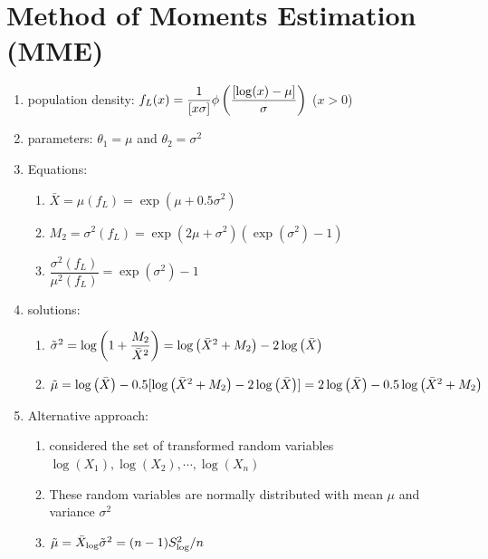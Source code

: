 \section{Method of Moments Estimation (MME) \cite{ism-1}} \label{Lognormal Distribution: MME}
\begin{enumerate}[itemsep=0.2cm]
    \item population density: $
        f_L(x) 
        = \dfrac{1}{[x\sigma]} \phi\left(
            \dfrac{[\log(x) - \mu]}{\sigma}
        \right)
    $ \hfill ($x > 0$)

    \item parameters: 
        $\theta_1 = \mu$ 
        and 
        $\theta_2 = \sigma^2$
    
    \item Equations:
    \begin{enumerate}[itemsep=0.2cm]
        \item $
            \bar{X}
            = \mu(f_L)
            = \exp(\mu + 0.5\sigma^2)
        $

        \item $
            M_2
            = \sigma^2(f_L)
            = \exp(2\mu + \sigma^2)(\exp(\sigma^2) - 1)
        $

        \item $
            \dfrac{\sigma^2(f_L)}{\mu^2(f_L)}
            = \exp(\sigma^2) - 1
        $

    \end{enumerate}

    \item solutions:
    \begin{enumerate}[itemsep=0.2cm]
        \item $
            \tilde{\sigma}^2
            = \log\left(1 + \dfrac{M_2}{\bar{X}^2}\right)
            = \log\left(\bar{X}^2 + {M_2}\right) - 2\log\left(\bar{X}\right)
        $

        \item $
            \tilde{\mu}
            = \log\left(\bar{X}\right) - 0.5[\log\left(\bar{X}^2 + {M_2}\right) - 2\log\left(\bar{X}\right)]
            = 2\log\left(\bar{X}\right) - 0.5\log\left(\bar{X}^2 + {M_2}\right)
        $

    \end{enumerate}

    \item Alternative approach:
    \begin{enumerate}[itemsep=0.2cm]
        \item considered the set of transformed random variables $\log(X_1), \log(X_2),\cdots, \log(X_n)$

        \item These random variables are normally distributed with mean $\mu$ and variance $\sigma^2$

        \item $
            \hfill 
            \tilde{\mu} = \bar{X}_{\log}
            \hfill
            \tilde{\sigma}^2 = (n-1)S_{\log}^2/n
            \hfill
        $

    \end{enumerate}

\end{enumerate}
